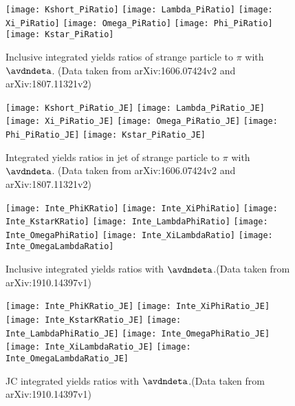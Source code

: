\begin{figure}[ht]
	\begin{center}
		\texttt{[image: Kshort\_PiRatio]}
		\texttt{[image: Lambda\_PiRatio]}
		\texttt{[image: Xi\_PiRatio]}
		\texttt{[image: Omega\_PiRatio]}
		\texttt{[image: Phi\_PiRatio]}	\texttt{[image: Kstar\_PiRatio]}
	\end{center}
	\caption{Inclusive integrated yields ratios of strange particle to $\pi$ with $\avdndeta$. (Data taken from arXiv:1606.07424v2 and arXiv:1807.11321v2)}
	\label{fig:InclIntePartoPiRatio}
\end{figure}


\begin{figure}[ht]
	\begin{center}
		\texttt{[image: Kshort\_PiRatio\_JE]}
		\texttt{[image: Lambda\_PiRatio\_JE]}
		\texttt{[image: Xi\_PiRatio\_JE]}
		\texttt{[image: Omega\_PiRatio\_JE]}
		\texttt{[image: Phi\_PiRatio\_JE]}
		\texttt{[image: Kstar\_PiRatio\_JE]}
	\end{center}
	\caption{Integrated yields ratios in jet of strange particle to $\pi$ with $\avdndeta$. (Data taken from arXiv:1606.07424v2 and arXiv:1807.11321v2)}
	\label{fig:JEIntePartoPiRatio}
\end{figure}

\begin{figure}[ht]
	\begin{center}
		\texttt{[image: Inte\_PhiKRatio]}		\texttt{[image: Inte\_XiPhiRatio]}
		\texttt{[image: Inte\_KstarKRatio]}
		\texttt{[image: Inte\_LambdaPhiRatio]}
		\texttt{[image: Inte\_OmegaPhiRatio]}
		\texttt{[image: Inte\_XiLambdaRatio]}
		\texttt{[image: Inte\_OmegaLambdaRatio]}
	\end{center}
	\caption{Inclusive integrated yields ratios with $\avdndeta$.(Data taken from arXiv:1910.14397v1)}
	\label{fig:InclInteParRatio}
\end{figure}

\begin{figure}[ht]
	\begin{center}	
		\texttt{[image: Inte\_PhiKRatio\_JE]}		
		\texttt{[image: Inte\_XiPhiRatio\_JE]}
		\texttt{[image: Inte\_KstarKRatio\_JE]}
		\texttt{[image: Inte\_LambdaPhiRatio\_JE]}
		\texttt{[image: Inte\_OmegaPhiRatio\_JE]}
		\texttt{[image: Inte\_XiLambdaRatio\_JE]}
		\texttt{[image: Inte\_OmegaLambdaRatio\_JE]}
	\end{center}
	\caption{JC integrated yields ratios with $\avdndeta$.(Data taken from arXiv:1910.14397v1)}
	\label{fig:JCInteParRatio}
\end{figure}

